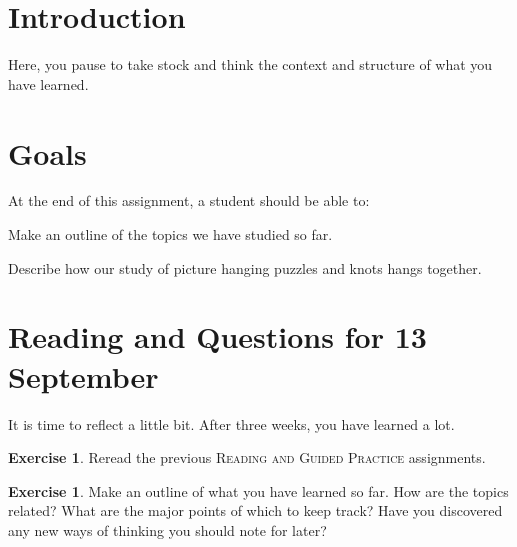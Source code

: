 \documentclass[12pt,letterpaper]{article}
\theoremstyle{definition}
\newtheorem{exercise}[question]{Exercise}
\begin{document}
\setlength{\parskip}{1ex plus 0.5ex minus 0.2ex}
\setlength{\parindent}{0pt}

\pagestyle{fancy}
\cfoot{}

\section*{Introduction}

Here, you pause to take stock and think the context and structure of what you have learned.

\section*{Goals}
At the end of this assignment, a student should be able to:
\begin{compactitem}
\item Make an outline of the topics we have studied so far.
\item Describe how our study of picture hanging puzzles and knots hangs together.
\end{compactitem}


\section*{Reading and Questions for 13 September}


It is time to reflect a little bit. After three weeks, you have learned a lot.

\begin{exercise}
Reread the previous \textsc{Reading and Guided Practice} assignments.
\end{exercise}

\begin{exercise}
Make an outline of what you have learned so far.
How are the topics related?
What are the major points of which to keep track?
Have you discovered any new ways of thinking you should note for later?
\end{exercise}






\end{document}
